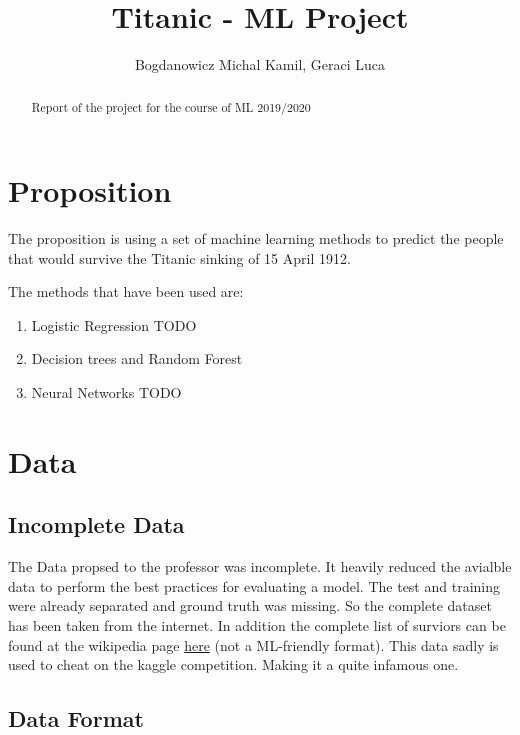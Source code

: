 \documentclass{article}
\begin{document}
\title{Titanic - ML Project}
\author{Bogdanowicz Michal Kamil, Geraci Luca}

\maketitle

\begin{abstract}
Report of the project for the course of ML 2019/2020
\end{abstract}


\section{Proposition}
The proposition is using a set of machine learning methods to predict the people that would survive the Titanic sinking of 15 April 1912.

The methods that have been used are:

\begin{enumerate}  
\item Logistic Regression TODO
\item Decision trees and Random Forest
\item Neural Networks TODO
\end{enumerate}

\section{Data}
\subsection{Incomplete Data}

The Data propsed to the professor was incomplete. It heavily reduced the avialble data to perform the best practices for evaluating a model. The test and training were already separated and ground truth was missing. So the complete dataset has been taken from the internet. In addition the complete list of surviors can be found at the wikipedia page \href{https://en.wikipedia.org/wiki/Passengers_of_the_RMS_Titanic}{here} (not a ML-friendly format).
This data sadly is used to cheat on the kaggle competition. Making it a quite infamous one.

\subsection{Data Format}
\end{document}
